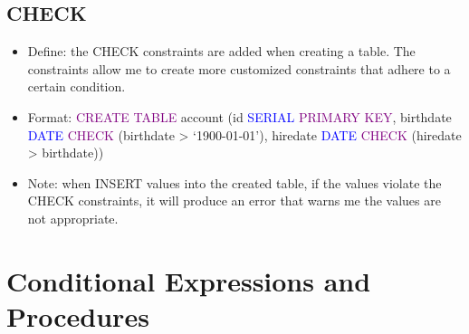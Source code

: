 \documentclass[a4paper]{article}
\begin{document}
\subsection{CHECK}
\begin{itemize}
  \item Define: the CHECK constraints are added when creating a table. The constraints allow me to create more customized constraints that adhere to a certain condition. 
  \item Format: \textcolor{purple}{CREATE TABLE} account (id \textcolor{blue}{SERIAL} \textcolor{purple}{PRIMARY KEY}, birthdate \textcolor{blue}{DATE} \textcolor{purple}{CHECK} (birthdate > `1900-01-01'), hiredate \textcolor{blue}{DATE} \textcolor{purple}{CHECK} (hiredate > birthdate))
  \item Note: when INSERT values into the created table, if the values violate the CHECK constraints, it will produce an error that warns me the values are not appropriate.
\end{itemize}

\section{Conditional Expressions and Procedures}
\end{document}
